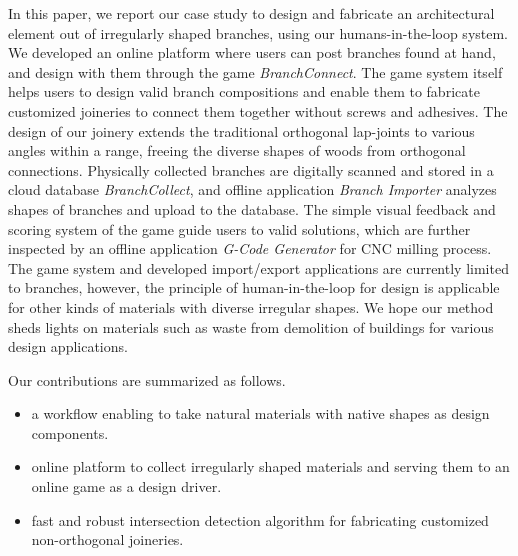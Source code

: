 In this paper, we report our case study to design and fabricate an architectural element out of irregularly shaped branches, using our humans-in-the-loop system.
We developed an online platform where users can post branches found at hand, and design with them through the game \textit{BranchConnect}.
The game system itself helps users to design valid branch compositions and enable them to fabricate customized joineries to connect them together without screws and adhesives.
The design of our joinery extends the traditional orthogonal lap-joints to various angles within a range, freeing the diverse shapes of woods from orthogonal connections.
Physically collected branches are digitally scanned and stored in a cloud database \textit{BranchCollect}, and offline application \textit{Branch Importer} analyzes shapes of branches and upload to the database.
The simple visual feedback and scoring system of the game guide users to valid solutions, which are further inspected by an offline application \textit{G-Code Generator} for CNC milling process.
The game system and developed import/export applications are currently limited to branches, however, the principle of human-in-the-loop for design is applicable for other kinds of materials with diverse irregular shapes.
We hope our method sheds lights on materials such as waste from demolition of buildings for various design applications.


Our contributions are summarized as follows.
\begin{itemize}
 \item{a workflow enabling to take natural materials with native shapes as design components.}
 \item{online platform to collect irregularly shaped materials and serving them to an online game as a design driver.}
 \item{fast and robust intersection detection algorithm for fabricating customized non-orthogonal joineries.}
\end{itemize}



